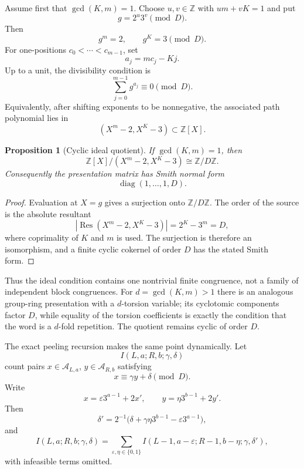 \documentclass[11pt]{amsart}
\numberwithin{equation}{section}
\newtheorem{proposition}[theorem]{Proposition}
\newcommand{\A}{\mathcal A}
\newcommand{\eps}{\varepsilon}
\begin{document}
Assume first that $\gcd(K,m)=1$.  Choose $u,v\in\mathbb Z$ with $um+vK=1$ and put
\[
g=2^u3^v\pmod D.
\]
Then
\[
g^m=2,
\qquad
g^K=3\pmod D.
\]
For one-positions $c_0<\cdots<c_{m-1}$, set
\[
a_j=mc_j-Kj.
\]
Up to a unit, the divisibility condition is
\begin{equation}\label{eq:path-poly-congruence}
\sum_{j=0}^{m-1}g^{a_j}\equiv0\pmod D.
\end{equation}
Equivalently, after shifting exponents to be nonnegative, the associated path polynomial lies in
\begin{equation}\label{eq:ideal}
(X^m-2,X^K-3)\subset\mathbb Z[X].
\end{equation}

\begin{proposition}[Cyclic ideal quotient]\label{prop:ideal-quotient}
If $\gcd(K,m)=1$, then
\[
\mathbb Z[X]/(X^m-2,X^K-3)\cong\mathbb Z/D\mathbb Z.
\]
Consequently the presentation matrix has Smith normal form
\begin{equation}\label{eq:SNF}
\operatorname{diag}(1,\ldots,1,D).
\end{equation}
\end{proposition}

\begin{proof}
Evaluation at $X=g$ gives a surjection onto $\mathbb Z/D\mathbb Z$.  The order of the source is the absolute resultant
\[
|\operatorname{Res}(X^m-2,X^K-3)|=2^K-3^m=D,
\]
where coprimality of $K$ and $m$ is used.  The surjection is therefore an isomorphism, and a finite cyclic cokernel of order $D$ has the stated Smith form.
\end{proof}

Thus the ideal condition contains one nontrivial finite congruence, not a family of independent block congruences.  For $d=\gcd(K,m)>1$ there is an analogous group-ring presentation with a $d$-torsion variable; its cyclotomic components factor $D$, while equality of the torsion coefficients is exactly the condition that the word is a $d$-fold repetition.  The quotient remains cyclic of order $D$.

The exact peeling recursion makes the same point dynamically.  Let
\[
I(L,a;R,b;\gamma,\delta)
\]
count pairs $x\in\A_{L,a}$, $y\in\A_{R,b}$ satisfying
\[
x\equiv\gamma y+\delta\pmod D.
\]
Write
\[
x=\eps3^{a-1}+2x',
\qquad
y=\eta3^{b-1}+2y'.
\]
Then
\begin{equation}\label{eq:affine-recursion}
\delta'
=2^{-1}\bigl(\delta+\gamma\eta3^{b-1}-\eps3^{a-1}\bigr),
\end{equation}
and
\begin{equation}\label{eq:I-recursion}
I(L,a;R,b;\gamma,\delta)
=
\sum_{\eps,\eta\in\{0,1\}}
I(L-1,a-\eps;R-1,b-\eta;\gamma,\delta'),
\end{equation}
with infeasible terms omitted.
\end{document}
